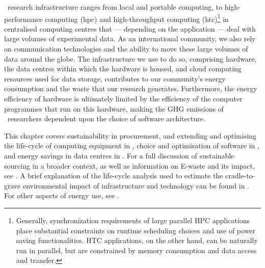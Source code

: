 \documentclass[../SustainableHEP.tex]{subfiles}
\begin{document}
\ACR\ research infrastructure ranges from local and portable computing, to high-performance computing (\acrshort{hpc}) and high-throughput computing (\acrshort{htc})\footnote{Generally, synchronization requirements of large parallel HPC applications place substantial constraints on runtime scheduling choices and use of power saving functionalities.  HTC applications, on the other hand, can be naturally run in parallel, but are constrained by memory consumption and data access and transfer.} in centralised computing centres that {---} depending on the application {---} deal with large volumes of experimental data. As an international community, we also rely on communication technologies and the ability to move these large volumes of data around the globe. The infrastructure we use to do so, comprising hardware, the data centres within which the hardware is housed, and cloud computing resources used for data storage, contributes to our community's energy consumption and the waste that our research generates.  Furthermore, the energy efficiency of hardware is ultimately limited by the efficiency of the computer programmes that run on this hardware, making the GHG emissions of \ACR\ researchers dependent upon the choice of software architecture.

This chapter covers sustainability in procurement, and  extending and optimising the life-cycle of computing equipment in , choice and optimisation of software in , and energy savings in data centres in .  For a full discussion of sustainable sourcing in a broader context, as well as information on E-waste and its impact, see . A brief explanation of the life-cycle analysis used to estimate the cradle-to-grave environmental impact of infrastructure and technology can be found in .  For other aspects of energy use, see .

\end{document}
